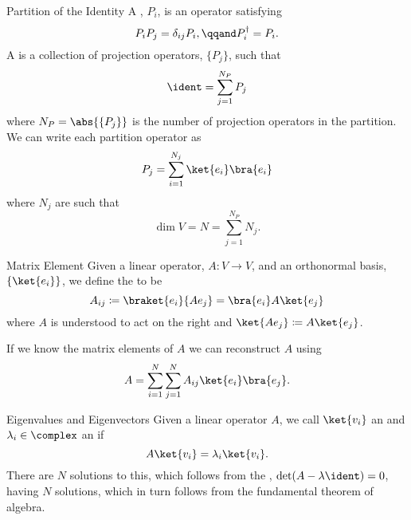 \begin{dfn}{Partition of the Identity}{}
    A , \(P_i\), is an operator satisfying
    \begin{equation}
        P_iP_j = \delta_{ij}P_i, \qqand P_i^\hermit = P_i.
    \end{equation}
    A  is a collection of projection operators, \(\{P_j\}\), such that
    \begin{equation}
        \ident = \sum_{j=1}^{N_P} P_j
    \end{equation}
    where \(N_P = \abs{\{P_j\}}\) is the number of projection operators in the partition.
    We can write each partition operator as
    \begin{equation}
        P_j = \sum_{i=1}^{N_j} \ket{e_i}\bra{e_i}
    \end{equation}
    where \(N_j\) are such that
    \begin{equation}
        \dim V = N = \sum_{j=1}^{N_P}N_j.
    \end{equation}
\end{dfn}

\begin{dfn}{Matrix Element}{}
    Given a linear operator, \(A \colon V \to V\), and an orthonormal basis, \(\{\ket{e_i}\}\), we define the  to be
    \begin{equation}
        A_{ij} \coloneqq \braket{e_i}{Ae_j} = \bra{e_i}A\ket{e_j}
    \end{equation}
    where \(A\) is understood to act on the right and \(\ket{Ae_j} \coloneqq A\ket{e_j}\).
    
    If we know the matrix elements of \(A\) we can reconstruct \(A\) using
    \begin{equation}
        A = \sum_{i=1}^{N}\sum_{j=1}^{N} A_{ij}\ket{e_i}\bra{e_j}.
    \end{equation}
\end{dfn}

\begin{dfn}{Eigenvalues and Eigenvectors}{}
    Given a linear operator \(A\), we call \(\ket{v_i}\) an  and \(\lambda_i\in\complex\) an  if
    \begin{equation}
        A\ket{v_i} = \lambda_i\ket{v_i}.
    \end{equation}
    There are \(N\) solutions to this, which follows from the , \(\det(A - \lambda\ident) = 0\), having \(N\) solutions, which in turn follows from the fundamental theorem of algebra.
\end{dfn}

